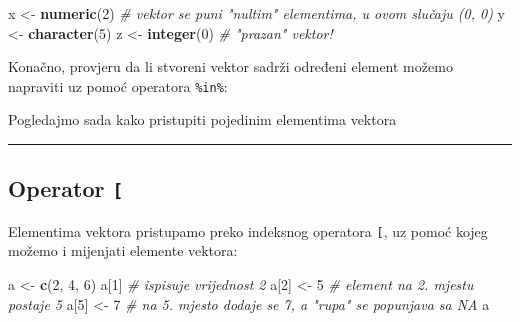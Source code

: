 \documentclass[]{book}
\newenvironment{Shaded}{\begin{snugshade}}{\end{snugshade}}
\newcommand{\KeywordTok}[1]{\textcolor[rgb]{0.13,0.29,0.53}{\textbf{#1}}}
\newcommand{\DecValTok}[1]{\textcolor[rgb]{0.00,0.00,0.81}{#1}}
\newcommand{\StringTok}[1]{\textcolor[rgb]{0.31,0.60,0.02}{#1}}
\newcommand{\CommentTok}[1]{\textcolor[rgb]{0.56,0.35,0.01}{\textit{#1}}}
\newcommand{\OperatorTok}[1]{\textcolor[rgb]{0.81,0.36,0.00}{\textbf{#1}}}
\newcommand{\NormalTok}[1]{#1}
\theoremstyle{definition}
\theoremstyle{definition}
\theoremstyle{definition}
\theoremstyle{remark}
\begin{document}
\begin{Shaded}
\begin{Highlighting}[]
\NormalTok{x <-}\StringTok{ }\KeywordTok{numeric}\NormalTok{(}\DecValTok{2}\NormalTok{)         }\CommentTok{# vektor se puni "nultim" elementima, u ovom slučaju (0, 0)}
\NormalTok{y <-}\StringTok{ }\KeywordTok{character}\NormalTok{(}\DecValTok{5}\NormalTok{)}
\NormalTok{z <-}\StringTok{ }\KeywordTok{integer}\NormalTok{(}\DecValTok{0}\NormalTok{)         }\CommentTok{# "prazan" vektor!}
\end{Highlighting}
\end{Shaded}

Konačno, provjeru da li stvoreni vektor sadrži određeni element možemo
napraviti uz pomoć operatora \texttt{\%in\%}:

\begin{Shaded}
\end{Shaded}

Pogledajmo sada kako pristupiti pojedinim elementima vektora

\begin{center}\rule{0.5\linewidth}{\linethickness}\end{center}

\subsection{\texorpdfstring{Operator
\texttt{{[}}}{Operator {[}}}\label{operator}

Elementima vektora pristupamo preko indeksnog operatora \texttt{{[}}, uz
pomoć kojeg možemo i mijenjati elemente vektora:

\begin{Shaded}
\begin{Highlighting}[]
\NormalTok{a <-}\StringTok{ }\KeywordTok{c}\NormalTok{(}\DecValTok{2}\NormalTok{, }\DecValTok{4}\NormalTok{, }\DecValTok{6}\NormalTok{)}
\NormalTok{a[}\DecValTok{1}\NormalTok{]             }\CommentTok{# ispisuje vrijednost 2}
\NormalTok{a[}\DecValTok{2}\NormalTok{] <-}\StringTok{ }\DecValTok{5}        \CommentTok{# element na 2. mjestu postaje 5}
\NormalTok{a[}\DecValTok{5}\NormalTok{] <-}\StringTok{ }\DecValTok{7}        \CommentTok{# na 5. mjesto dodaje se 7, a "rupa" se popunjava sa NA}
\NormalTok{a}
\end{Highlighting}
\end{Shaded}
\end{document}
